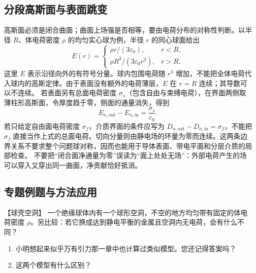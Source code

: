 \subsection{分段高斯面与表面跳变}
高斯面必须是闭合曲面；曲面上场强是否相等，要由电荷分布的对称性判断。以半径 $R$、体电荷密度 $\rho$ 的均匀实心球为例，半径 $r$ 的同心球面给出
\[
 E(r)=\begin{cases}\rho r/(3\varepsilon_0),&r<R,\\
 \rho R^3/(3\varepsilon_0r^2),&r>R.
 \end{cases}
\]
这里 $E$ 表示沿径向外的有符号分量。球内包围电荷随 $r^3$ 增加，不能把全体电荷代入球内的高斯定律。由于表面没有额外的电荷薄层，$E$ 在 $r=R$ 连续；其导数可以不连续。
若表面另有总面电荷密度 $\sigma_s$（包含自由与束缚电荷），在界面两侧取薄柱形高斯面，令厚度趋于零，侧面的通量消失，得到
\[
 E_{n,\mathrm{out}}-E_{n,\mathrm{in}}=\frac{\sigma_s}{\varepsilon_0}.
\]
若只给定自由面电荷密度 $\sigma_f$，介质界面的条件应写为 $D_{n,\mathrm{out}}-D_{n,\mathrm{in}}=\sigma_f$，不能把 $\sigma_f$ 直接当作上式的总面电荷。切向分量则由静电场的环量为零而连续。这两条边界关系不要求整个问题球对称，因而也能用于导体表面、带电平面和分层介质的局部检查。
不要把“闭合面净通量为零”误读为“面上处处无场”：外部电荷产生的场可以穿入又穿出同一曲面，净贡献恰好抵消。


\subsection{专题例题与方法应用}

\begin{origexamplebox}{【球壳空洞】}\label{ch19:ex:s32-1-3}
一个绝缘球体内有一个球形空洞，不空的地方均匀带有固定的体电荷密度 $\rho$。另比较：若它换成达到静电平衡的金属且空洞内无电荷，会有什么不同？
\begin{enumerate}[label=\arabic*.]
  \item 小明想起来似乎万有引力那一章中也计算过类似模型。您还记得答案吗？
  \item 这两个模型有什么区别？
\end{enumerate}

\ThQCavity
\end{origexamplebox}\par\nopagebreak[4]


